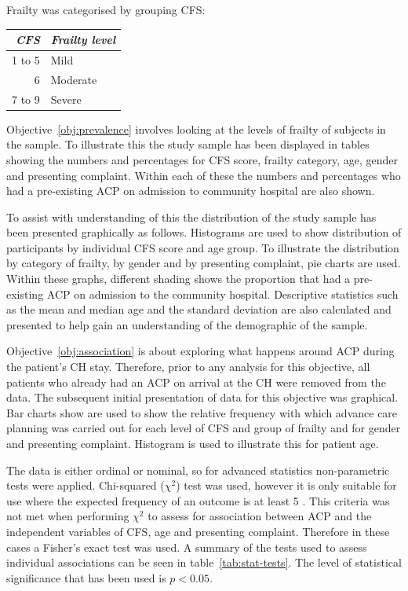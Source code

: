 \documentclass
[
	12pt,
	a4paper,
	oneside,
]{report}
\begin{document}
Frailty was categorised by grouping CFS:
\label{ref:cfs-grouping}

\begin{tabular}{ r l }
\emph{CFS} & \emph{Frailty level} \\
\hline
1 to 5	& Mild	\\
6		& Moderate \\
7 to 9	& Severe \\
\end{tabular}

Objective~\ref{obj:prevalence} involves looking at the levels of frailty of
subjects in the sample. To illustrate this the study sample has been 
displayed in tables showing the numbers and percentages for CFS score, 
frailty category, age, gender and presenting complaint. Within each
of these the numbers and percentages who had a pre-existing ACP
on admission to community hospital are also shown.

To assist with understanding of this the distribution of the study sample 
has been presented graphically as follows.
Histograms are used to show distribution of participants by individual 
CFS score and age group.  
To illustrate the distribution by category of frailty, by gender and by presenting 
complaint, pie charts are used. Within these graphs, different shading shows
the proportion that had a pre-existing ACP on admission to the community hospital.
Descriptive statistics such as the mean and median age and the standard deviation
are also calculated and presented to help gain an understanding of the 
demographic of the sample.

Objective~\ref{obj:association} is about exploring what happens around ACP
during the patient's CH stay. Therefore, prior to any analysis for this 
objective, all patients who already had an ACP on arrival at the CH were
removed from the data.
The subsequent initial presentation of data for this objective was
graphical. Bar charts show are used to show the relative frequency with which 
advance care planning
was carried out for each level of CFS and group of frailty and for gender and
presenting complaint. Histogram is used to illustrate this for patient age.

The data is either ordinal or nominal, so for advanced statistics
non-parametric tests were applied. Chi-squared ($\chi^2$) test was used, 
however it is only
suitable for use where the expected frequency of an outcome is at least 5
\parencite[page 690]{field:09}. This criteria was not met when performing 
$\chi^2$ to assess for association between ACP and the independent variables 
of CFS, age and presenting complaint. Therefore in these cases a Fisher's exact
test was used. A summary of the tests used to assess individual associations
can be seen in table~\ref{tab:stat-tests}. 
The level of statistical significance that has been used is
$p<0.05$.
\end{document}
